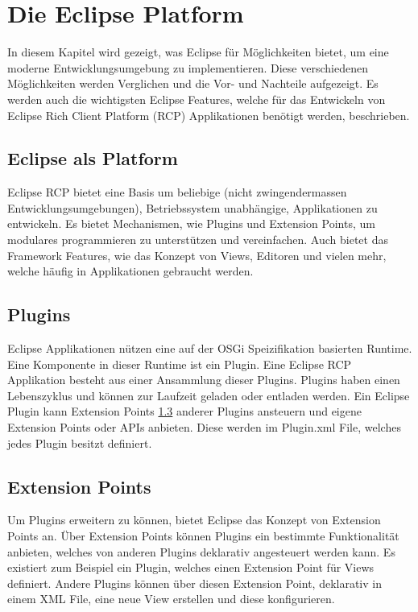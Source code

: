 \chapter{Die Eclipse Platform}
\label{sec:EclipsePlatform}

In diesem Kapitel wird gezeigt, was Eclipse für Möglichkeiten bietet, um eine moderne Entwicklungsumgebung zu implementieren. Diese verschiedenen Möglichkeiten werden Verglichen und die Vor- und Nachteile aufgezeigt. Es werden auch die wichtigsten Eclipse Features, welche für das Entwickeln von Eclipse Rich Client Platform (RCP) Applikationen benötigt werden, beschrieben.

\section{Eclipse als Platform}

Eclipse RCP bietet eine Basis um beliebige (nicht zwingendermassen Entwicklungsumgebungen), Betriebssystem unabhängige, Applikationen zu entwickeln. Es bietet Mechanismen, wie Plugins und Extension Points, um modulares programmieren zu unterstützen und vereinfachen. Auch bietet das Framework Features, wie das Konzept von Views, Editoren und vielen mehr, welche häufig in Applikationen gebraucht werden.

\section{Plugins}

Eclipse Applikationen nützen eine auf der OSGi Speizifikation basierten Runtime. Eine Komponente in dieser Runtime ist ein Plugin. Eine Eclipse RCP Applikation besteht aus einer Ansammlung dieser Plugins.\cite{whatisaplugin} Plugins haben einen Lebenszyklus und können zur Laufzeit geladen oder entladen werden. Ein Eclipse Plugin kann Extension Points \ref{extensionpointssection} anderer Plugins ansteuern und eigene Extension Points oder APIs anbieten. Diese werden im Plugin.xml File, welches jedes Plugin besitzt definiert.

\section{Extension Points}
\label{extensionpointssection}

Um Plugins erweitern zu können, bietet Eclipse das Konzept von Extension Points an. Über Extension Points können Plugins ein bestimmte Funktionalität anbieten, welches von anderen Plugins deklarativ angesteuert werden kann. 
\newline
Es existiert zum Beispiel ein Plugin, welches einen Extension Point für Views definiert. Andere Plugins können über diesen Extension Point, deklarativ in einem XML File, eine neue View erstellen und diese konfigurieren. \cite{extensionpoints}

